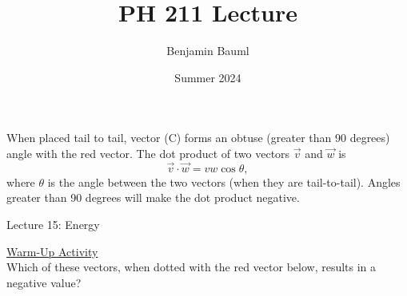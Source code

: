 \documentclass[]{article}
\title{PH 211 Lecture \Week}
\author{Benjamin Bauml}
\date{Summer 2024}
\newcommand{\Week}{15}
\begin{document}
\begin{TeacherMargin}
\noindent When placed tail to tail, vector (C) forms an obtuse (greater than 90 degrees) angle with the red vector. The dot product of two vectors $\vec{v}$ and $\vec{w}$ is
\[
\vec{v}\cdot\vec{w} = vw\cos\theta,
\]
where $\theta$ is the angle between the two vectors (when they are tail-to-tail). Angles greater than 90 degrees will make the dot product negative.
\end{TeacherMargin}
\begin{PresentSpace}
\begin{center}
	\huge Lecture \Week: Energy
\end{center}
\vspace{0.5cm}
\underline{Warm-Up Activity} \\
Which of these vectors, when dotted with the red vector below, results in a negative value? \\
\end{PresentSpace}
\newpage
\end{document}
